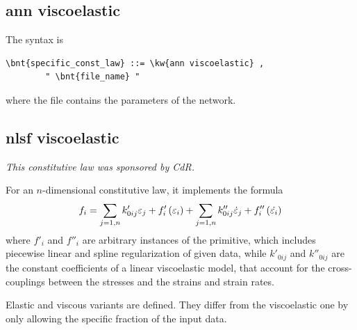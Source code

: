 \subsection{ann viscoelastic}\label{sec:CL:ANN-VISCOELASTIC}
The syntax is
\begin{Verbatim}[commandchars=\\\{\}]
    \bnt{specific_const_law} ::= \kw{ann viscoelastic} ,
        " \bnt{file_name} "
\end{Verbatim}
where the file  contains the parameters of the network.

\subsection{nlsf viscoelastic}
\emph{This constitutive law was sponsored
by  CdR.}
\bigskip

For an $n$-dimensional constitutive law, it implements the formula
\begin{equation}
        f_i
        = \sum_{j=1,n} k'_{0ij} \varepsilon_j
        + f'_i\left( \varepsilon_i \right)
        + \sum_{j=1,n} k''_{0ij} \dot{\varepsilon}_j
        + f''_i\left( \dot{\varepsilon_i} \right)
        \label{eq:nlsf-cl}
\end{equation}
where $f'_i$ and $f''_i$ are arbitrary instances
of the  primitive,
which includes piecewise linear and spline regularization
of given data, while $k'_{0ij}$ and $k''_{0ij}$ are the constant
coefficients of a linear viscoelastic model, that account
for the cross-couplings between the stresses 
and the strains and strain rates.

Elastic and viscous variants are defined.
They differ from the viscoelastic one by only allowing
the specific fraction of the input data.

